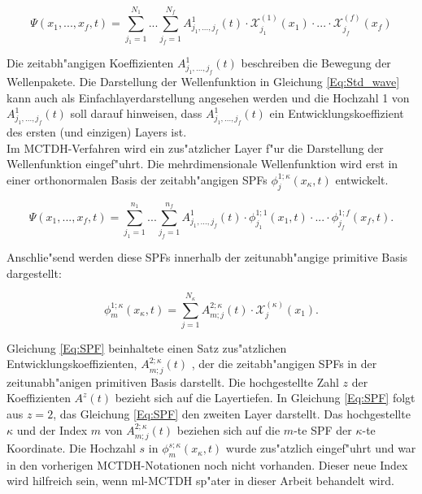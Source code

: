  \begin{equation}
 \Psi(x_{1},..., x_{f}, t)=\sum^{N_{1}}_{j_{1}=1} ... \sum^{N_{f}}_{j_{f}=1} A^{1}_{j_{1}, ..., j_{f}}(t)\cdot \mathcal{X}^{(1)}_{j_{1}}(x_{1}) \cdot ... \cdot \mathcal{X}^{(f)}_{j_{f}}(x_{f})
 \label{Eq:Std_wave}
 \end{equation}

Die zeitabh"angigen Koeffizienten $A^{1}_{j_{1}, ..., j_{f}}(t)$ beschreiben die Bewegung der Wellenpakete.
Die Darstellung der Wellenfunktion in Gleichung  \ref{Eq:Std_wave} kann auch als Einfach\-layerdarstellung angesehen werden
und die Hochzahl 1 von $A^{1}_{j_{1}, ..., j_{f}}(t)$ soll darauf hinweisen, dass $A^{1}_{j_{1}, ..., j_{f}}(t)$ ein Entwicklungskoeffizient
des ersten (und einzigen) Layers ist.
\\Im MCTDH-Verfahren wird ein zus"atzlicher Layer f"ur die Darstellung der Wellenfunktion eingef"uhrt.
Die mehrdimensionale Wellenfunktion wird erst in einer orthonormalen Basis der zeitabh"angigen SPFs $\phi^{1;\kappa}_{j}(x_{\kappa},t)$
entwickelt.


 \begin{equation}
 \Psi(x_{1},..., x_{f}, t)=\sum^{n_{1}}_{j_{1}=1} ... \sum^{n_{f}}_{j_{f}=1} A^{1}_{j_{1}, ..., j_{f}}(t)
 \cdot \phi^{1;1}_{j_{1}}(x_{1}, t) \cdot ... \cdot \phi^{1;f}_{j_{f}}(x_{f}, t).
 \label{Eq:mctdh_wave}
 \end{equation}

Anschlie"send werden diese SPFs innerhalb der zeitunabh"angige primitive Basis dargestellt: 

\begin{equation}
 \phi^{1;\kappa}_{m} (x_{\kappa}, t)=\sum^{N_{\kappa}}_{j=1} A^{2;\kappa}_{m;j}(t) \cdot \mathcal{X}^{(\kappa)}_{j}(x_{1}).
 \label{Eq:SPF}
 \end{equation}

Gleichung \ref{Eq:SPF} beinhaltete einen Satz zus"atzlichen Entwicklungskoeffizienten, $ A^{2;\kappa}_{m;j}(t) $ , der die zeitabh"angigen SPFs
in der zeitunabh"anigen primitiven Basis darstellt.
Die hochgestellte Zahl $z$ der Koeffizienten $A^{z}(t)$ bezieht sich auf die Layertiefen.
In Gleichung \ref{Eq:SPF} folgt aus $z=2$, das Gleichung \ref{Eq:SPF} den zweiten Layer darstellt.
Das hochgestellte $\kappa$ und der Index $m$ von $A^{2;\kappa}_{m;j}(t)$ beziehen sich auf die $m$-te SPF der $\kappa$-te Koordinate.
Die Hochzahl $s$ in $ \phi^{s;\kappa}_{m} (x_{\kappa}, t) $ wurde zus"atzlich eingef"uhrt und
war in den vorherigen MCTDH-Notationen \cite{MMC1} noch nicht vorhanden. Dieser neue Index wird hilfreich sein, wenn ml-MCTDH
sp"ater in dieser Arbeit behandelt wird.  

